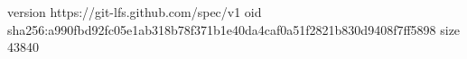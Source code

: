 version https://git-lfs.github.com/spec/v1
oid sha256:a990fbd92fc05e1ab318b78f371b1e40da4caf0a51f2821b830d9408f7ff5898
size 43840

